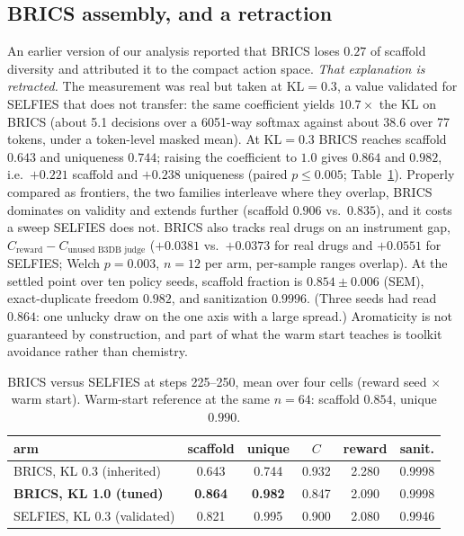 \documentclass[10pt,letterpaper]{article}
\begin{document}
\subsection{BRICS assembly, and a retraction}\label{sec:brics}
An earlier version of our analysis reported that BRICS loses $0.27$ of scaffold diversity and attributed it to the compact action space. \emph{That explanation is retracted.} The measurement was real but taken at $\mathrm{KL}=0.3$, a value validated for SELFIES that does not transfer: the same coefficient yields $10.7\times$ the KL on BRICS (about 5.1 decisions over a 6051-way softmax against about 38.6 over 77 tokens, under a token-level masked mean). At $\mathrm{KL}=0.3$ BRICS reaches scaffold $0.643$ and uniqueness $0.744$; raising the coefficient to $1.0$ gives $0.864$ and $0.982$, i.e.\ $+0.221$ scaffold and $+0.238$ uniqueness (paired $p\le0.005$; Table~\ref{tab:brics}). Properly compared as frontiers, the two families interleave where they overlap, BRICS dominates on validity and extends further (scaffold $0.906$ vs.\ $0.835$), and it costs a sweep SELFIES does not. BRICS also tracks real drugs on an instrument gap, $C_{\text{reward}}-C_{\text{unused B3DB judge}}$ ($+0.0381$ vs.\ $+0.0373$ for real drugs and $+0.0551$ for SELFIES; Welch $p=0.003$, $n=12$ per arm, per-sample ranges overlap). At the settled point over ten policy seeds, scaffold fraction is $0.854\pm0.006$ (SEM), exact-duplicate freedom $0.982$, and sanitization $0.9996$. (Three seeds had read $0.864$: one unlucky draw on the one axis with a large spread.) Aromaticity is not guaranteed by construction, and part of what the warm start teaches is toolkit avoidance rather than chemistry.

\begin{table}[t]
\centering
\caption{BRICS versus SELFIES at steps 225--250, mean over four cells (reward seed $\times$ warm start). Warm-start reference at the same $n=64$: scaffold $0.854$, unique $0.990$.}
\label{tab:brics}
\begin{tabular}{@{}lccccc@{}}\toprule
arm & scaffold & unique & $C$ & reward & sanit.\\\midrule
BRICS, KL 0.3 (inherited) & 0.643 & 0.744 & 0.932 & 2.280 & 0.9998\\
\textbf{BRICS, KL 1.0 (tuned)} & \textbf{0.864} & \textbf{0.982} & 0.847 & 2.090 & 0.9998\\
SELFIES, KL 0.3 (validated) & 0.821 & 0.995 & 0.900 & 2.080 & 0.9946\\\bottomrule
\end{tabular}
\end{table}
\end{document}
